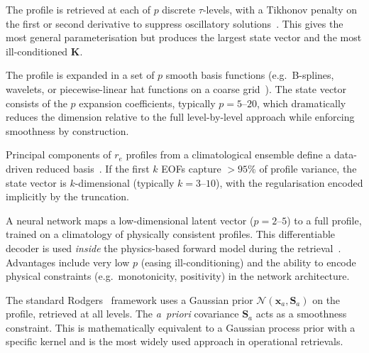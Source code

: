 \documentclass[11pt,a4paper]{article}
\newcommand{\vect}[1]{\bm{#1}}
\newcommand{\mat}[1]{\mathbf{#1}}
\theoremstyle{definition}
\begin{document}
\begin{description}[style=nextline, leftmargin=2em]
  \item[Level-by-level with smoothness regularisation]
    The profile is retrieved at each of $p$ discrete $\tau$-levels,
    with a Tikhonov penalty on the first or second derivative to
    suppress oscillatory solutions~\cite{steck2002,dubovik2000}.
    This gives the most general parameterisation but produces the
    largest state vector and the most ill-conditioned $\mat{K}$.

  \item[Basis-function expansion]
    The profile is expanded in a set of $p$ smooth basis functions
    (e.g.\ B-splines, wavelets, or piecewise-linear hat functions on
    a coarse grid~\cite{bowman2006}).  The state vector consists of
    the $p$ expansion coefficients, typically $p = 5$--$20$, which
    dramatically reduces the dimension relative to the full
    level-by-level approach while enforcing smoothness by construction.

  \item[EOF / PCA basis from climatological data]
    Principal components of $r_e$ profiles from a climatological
    ensemble define a data-driven reduced basis~\cite{masiello2012}.
    If the first $k$ EOFs capture $>95\%$ of profile variance, the
    state vector is $k$-dimensional (typically $k = 3$--$10$), with
    the regularisation encoded implicitly by the truncation.

  \item[Neural-network profile generator]
    A neural network maps a low-dimensional latent vector
    ($p = 2$--$5$) to a full profile, trained on a climatology of
    physically consistent profiles.  This differentiable decoder is
    used \emph{inside} the physics-based forward model during the
    retrieval~\cite{gebhard2024}.  Advantages include very low $p$
    (easing ill-conditioning) and the ability to encode physical
    constraints (e.g.\ monotonicity, positivity) in the network
    architecture.

  \item[Optimal estimation with \emph{a~priori} covariance]
    The standard Rodgers~\cite{rodgers2000} framework uses a Gaussian
    prior $\mathcal{N}(\vect{x}_a, \mat{S}_a)$ on the profile,
    retrieved at all levels.  The \emph{a~priori} covariance
    $\mat{S}_a$ acts as a smoothness constraint.  This is
    mathematically equivalent to a Gaussian process prior with a
    specific kernel and is the most widely used approach in operational
    retrievals.
\end{description}
\end{document}
